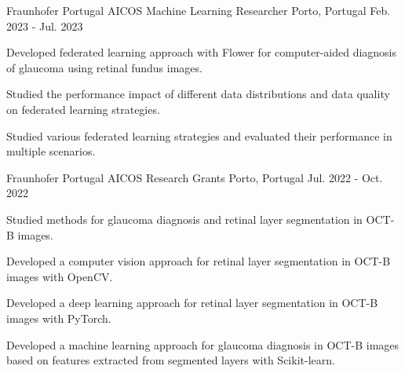 

\begin{cventries}

  \cventry
    {Fraunhofer Portugal AICOS} %
    {Machine Learning Researcher} %
    {Porto, Portugal} %
    {Feb. 2023 - Jul. 2023} %
    {
      \begin{cvitems} %
        \item {Developed federated learning approach with Flower for computer-aided diagnosis of glaucoma using retinal fundus images.}
        \item {Studied the performance impact of different data distributions and data quality on federated learning strategies.}
        \item {Studied various federated learning strategies and evaluated their performance in multiple scenarios.}
      \end{cvitems}
    }

  \cventry
    {Fraunhofer Portugal AICOS} %
    {Research Grants} %
    {Porto, Portugal} %
    {Jul. 2022 - Oct. 2022} %
    {
      \begin{cvitems} %
        \item {Studied methods for glaucoma diagnosis and retinal layer segmentation in OCT-B images.}
        \item {Developed a computer vision approach for retinal layer segmentation in OCT-B images with OpenCV.}
        \item {Developed a deep learning approach for retinal layer segmentation in OCT-B images with PyTorch.}
        \item {Developed a machine learning approach for glaucoma diagnosis in OCT-B images based on features extracted from segmented layers with Scikit-learn.}
      \end{cvitems}
    }

\end{cventries}

